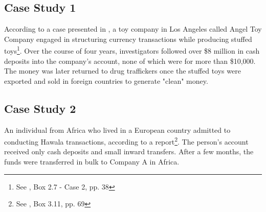 \subsection*{Case Study 1} 
According to a case presented in \cite{fatf-hawala}, a toy company in Los Angeles called Angel Toy Company engaged in structuring currency transactions while producing stuffed toys\footnote{See \cite{fatf-hawala}, Box 2.7 - Case 2, pp. 38}. Over the course of four years, investigators followed over \$8 million in cash deposits into the company's account, none of which were for more than \$10,000. The money was later returned to drug traffickers once the stuffed toys were exported and sold in foreign countries to generate "clean" money.

\subsection*{Case Study 2} 
An individual from Africa who lived in a European country admitted to conducting Hawala transactions, according to a report\footnote{See \cite{fatf-hawala}, Box 3.11, pp. 69}. The person's account received only cash deposits and small inward transfers. After a few months, the funds were transferred in bulk to Company A in Africa.